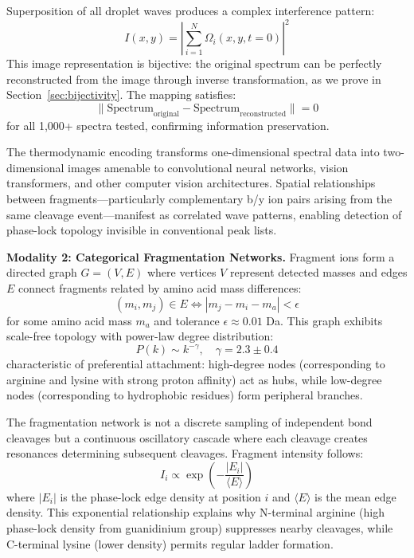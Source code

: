 \documentclass[11pt,twocolumn]{article}
\begin{document}
Superposition of all droplet waves produces a complex interference pattern:
\begin{equation}
    I(x, y) = \left| \sum_{i=1}^{N} \Omega_i(x, y, t=0) \right|^2
\end{equation}
This image representation is bijective: the original spectrum can be perfectly reconstructed from the image through inverse transformation, as we prove in Section~\ref{sec:bijectivity}. The mapping satisfies:
\begin{equation}
    \| \text{Spectrum}_{\text{original}} - \text{Spectrum}_{\text{reconstructed}} \| = 0
\end{equation}
for all 1,000+ spectra tested, confirming information preservation.

The thermodynamic encoding transforms one-dimensional spectral data into two-dimensional images amenable to convolutional neural networks, vision transformers, and other computer vision architectures. Spatial relationships between fragments---particularly complementary b/y ion pairs arising from the same cleavage event---manifest as correlated wave patterns, enabling detection of phase-lock topology invisible in conventional peak lists.

\textbf{Modality 2: Categorical Fragmentation Networks.} Fragment ions form a directed graph $G = (V, E)$ where vertices $V$ represent detected masses and edges $E$ connect fragments related by amino acid mass differences:
\begin{equation}
    (m_i, m_j) \in E \iff |m_j - m_i - m_a| < \epsilon
\end{equation}
for some amino acid mass $m_a$ and tolerance $\epsilon \approx 0.01$ Da. This graph exhibits scale-free topology with power-law degree distribution:
\begin{equation}
    P(k) \sim k^{-\gamma}, \quad \gamma = 2.3 \pm 0.4
\end{equation}
characteristic of preferential attachment: high-degree nodes (corresponding to arginine and lysine with strong proton affinity) act as hubs, while low-degree nodes (corresponding to hydrophobic residues) form peripheral branches.

The fragmentation network is not a discrete sampling of independent bond cleavages but a continuous oscillatory cascade where each cleavage creates resonances determining subsequent cleavages. Fragment intensity follows:
\begin{equation}
    I_i \propto \exp\left(-\frac{|E_i|}{\langle E \rangle}\right)
\end{equation}
where $|E_i|$ is the phase-lock edge density at position $i$ and $\langle E \rangle$ is the mean edge density. This exponential relationship explains why N-terminal arginine (high phase-lock density from guanidinium group) suppresses nearby cleavages, while C-terminal lysine (lower density) permits regular ladder formation.
\end{document}
